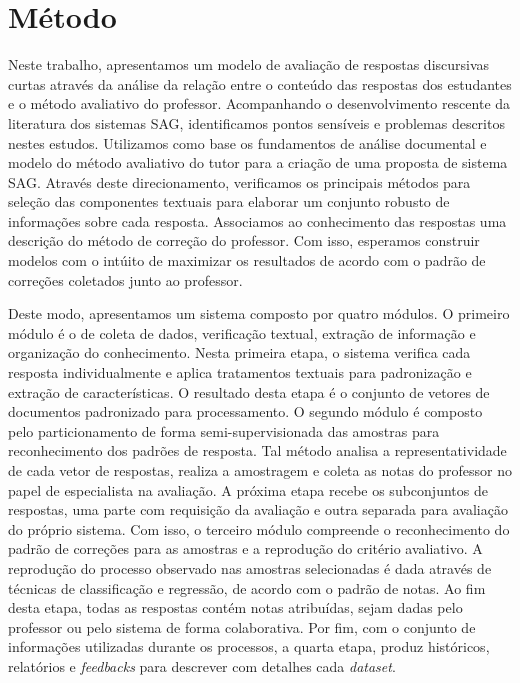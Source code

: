 \chapter{Método}
\label{cap-metodo}

Neste trabalho, apresentamos um modelo de avaliação de respostas discursivas curtas através da análise da relação entre o conteúdo das respostas dos estudantes e o método avaliativo do professor. Acompanhando o desenvolvimento rescente da literatura dos sistemas SAG, identificamos pontos sensíveis e problemas descritos nestes estudos. Utilizamos como base os fundamentos de análise documental e modelo do método avaliativo do tutor para a criação de uma proposta de sistema SAG. Através deste direcionamento, verificamos os principais métodos para seleção das componentes textuais para elaborar um conjunto robusto de informações sobre cada resposta. Associamos ao conhecimento das respostas uma descrição do método de correção do professor. Com isso, esperamos construir modelos com o intúito de maximizar os resultados de acordo com o padrão de correções coletados junto ao professor.

Deste modo, apresentamos um sistema composto por quatro módulos. O primeiro módulo é o de coleta de dados, verificação textual, extração de informação e organização do conhecimento. Nesta primeira etapa, o sistema verifica cada resposta individualmente e aplica tratamentos textuais para padronização e extração de características. O resultado desta etapa é o conjunto de vetores de documentos padronizado para processamento. O segundo módulo é composto pelo particionamento de forma semi-supervisionada das amostras para reconhecimento dos padrões de resposta. Tal método analisa a representatividade de cada vetor de respostas, realiza a amostragem e coleta as notas do professor no papel de especialista na avaliação. A próxima etapa recebe os subconjuntos de respostas, uma parte com requisição da avaliação e outra separada para avaliação do próprio sistema. Com isso, o terceiro módulo compreende o reconhecimento do padrão de correções para as amostras e a reprodução do critério avaliativo. A reprodução do processo observado nas amostras selecionadas é dada através de técnicas de classificação e regressão, de acordo com o padrão de notas. Ao fim desta etapa, todas as respostas contém notas atribuídas, sejam dadas pelo professor ou pelo sistema de forma colaborativa. Por fim, com o conjunto de informações utilizadas durante os processos, a quarta etapa, produz históricos, relatórios e \textit{feedbacks} para descrever com detalhes cada \textit{dataset}.

